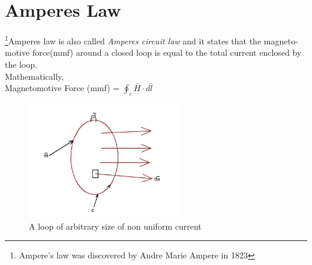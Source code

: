 \section{Amperes Law}
\footnote[7]{Ampere's law was discovered by Andre Marie Ampere in 1823 }Amperes law is also called \emph{Amperes circuit law} and it states that the magneto-motive force(mmf) around a closed loop is equal to the total current enclosed by the loop.\\
Mathematically, \\
Magnetomotive Force (mmf) = $\oint_c \bar{H} \cdot d\bar{l}$ 
\begin{figure}[h]
\centering
\includegraphics[height=5cm]{./graphics/j}
\caption{A loop of arbitrary size of non uniform current}
\label{fig:j}
\end{figure}

